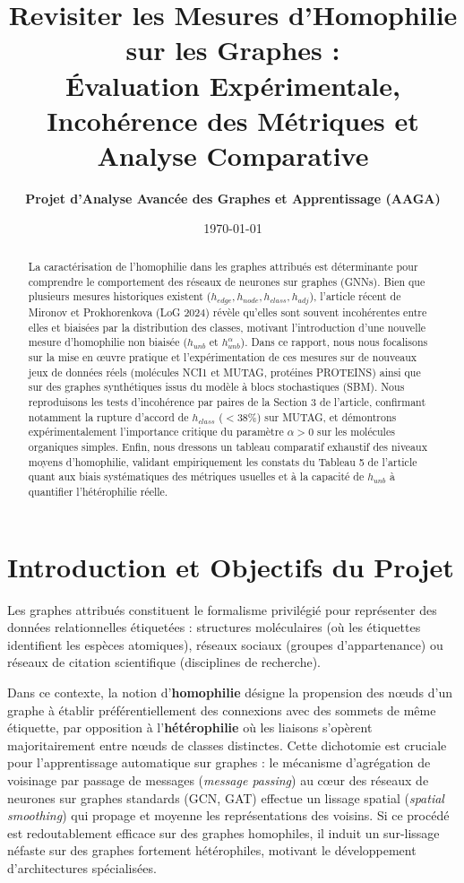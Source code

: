 \documentclass[11pt,a4paper]{article}
\title{\textbf{Revisiter les Mesures d'Homophilie sur les Graphes :}\\[0.3em]
\large Évaluation Expérimentale, Incohérence des Métriques et Analyse Comparative}
\author{\textbf{Projet d'Analyse Avancée des Graphes et Apprentissage (AAGA)}}
\date{\today}
\begin{document}
\maketitle

\begin{abstract}
La caractérisation de l'homophilie dans les graphes attribués est déterminante pour comprendre le comportement des réseaux de neurones sur graphes (GNNs). Bien que plusieurs mesures historiques existent ($h_{edge}, h_{node}, h_{class}, h_{adj}$), l'article récent de Mironov et Prokhorenkova (LoG 2024) révèle qu'elles sont souvent incohérentes entre elles et biaisées par la distribution des classes, motivant l'introduction d'une nouvelle mesure d'homophilie non biaisée ($h_{unb}$ et $h_{unb}^\alpha$). Dans ce rapport, nous nous focalisons sur la mise en œuvre pratique et l'expérimentation de ces mesures sur de nouveaux jeux de données réels (molécules NCI1 et MUTAG, protéines PROTEINS) ainsi que sur des graphes synthétiques issus du modèle à blocs stochastiques (SBM). Nous reproduisons les tests d'incohérence par paires de la Section 3 de l'article, confirmant notamment la rupture d'accord de $h_{class}$ ($< 38\%$) sur MUTAG, et démontrons expérimentalement l'importance critique du paramètre $\alpha > 0$ sur les molécules organiques simples. Enfin, nous dressons un tableau comparatif exhaustif des niveaux moyens d'homophilie, validant empiriquement les constats du Tableau 5 de l'article quant aux biais systématiques des métriques usuelles et à la capacité de $h_{unb}$ à quantifier l'hétérophilie réelle.
\end{abstract}

\newpage
\tableofcontents
\newpage

\section{Introduction et Objectifs du Projet}

Les graphes attribués constituent le formalisme privilégié pour représenter des données relationnelles étiquetées : structures moléculaires (où les étiquettes identifient les espèces atomiques), réseaux sociaux (groupes d'appartenance) ou réseaux de citation scientifique (disciplines de recherche).

Dans ce contexte, la notion d'\textbf{homophilie} désigne la propension des nœuds d'un graphe à établir préférentiellement des connexions avec des sommets de même étiquette, par opposition à l'\textbf{hétérophilie} où les liaisons s'opèrent majoritairement entre nœuds de classes distinctes. Cette dichotomie est cruciale pour l'apprentissage automatique sur graphes : le mécanisme d'agrégation de voisinage par passage de messages (\textit{message passing}) au cœur des réseaux de neurones sur graphes standards (GCN, GAT) effectue un lissage spatial (\textit{spatial smoothing}) qui propage et moyenne les représentations des voisins. Si ce procédé est redoutablement efficace sur des graphes homophiles, il induit un sur-lissage néfaste sur des graphes fortement hétérophiles, motivant le développement d'architectures spécialisées.
\end{document}
